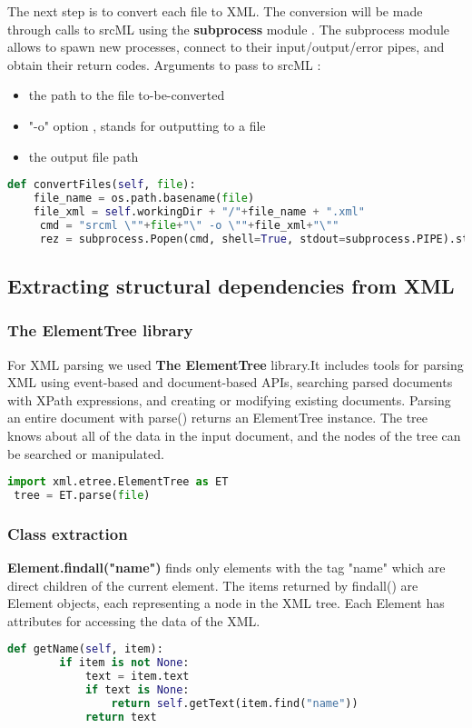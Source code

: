 The next step is to convert each file to XML. The conversion will be made through calls to srcML using the \textbf{subprocess} module . The subprocess module allows to spawn new processes, connect to their input/output/error pipes, and obtain their return codes. 
Arguments to pass to srcML :
\begin{itemize}
  \item the path to the file to-be-converted
  \item "-o" option , stands for outputting to a file 
  \item the output file path
\end{itemize}

\begin{lstlisting}[language=python, caption={Convert source code to XML using subprocess module.}]
def convertFiles(self, file):
    file_name = os.path.basename(file)
    file_xml = self.workingDir + "/"+file_name + ".xml"
     cmd = "srcml \""+file+"\" -o \""+file_xml+"\""
     rez = subprocess.Popen(cmd, shell=True, stdout=subprocess.PIPE).stdout.read()
\end{lstlisting}

\subsection{Extracting structural dependencies from XML}
\subsubsection{The ElementTree library}
For XML parsing we used \textbf{The ElementTree} library.It includes tools for parsing XML using event-based and document-based APIs, searching parsed documents with XPath expressions, and creating or modifying existing documents.
Parsing an entire document with parse() returns an ElementTree instance. The tree knows about all of the data in the input document, and the nodes of the tree can be searched or manipulated.

\begin{lstlisting}[language=python, caption={Import and create ElementTree instance}]
 import xml.etree.ElementTree as ET
 tree = ET.parse(file)
\end{lstlisting}

\subsubsection{Class extraction}
\textbf{Element.findall("name")} finds only elements with the tag "name" which are direct children of the current element. The items returned by findall() are Element objects, each representing a node in the XML tree. Each Element has attributes for accessing the data of the XML.
\begin{lstlisting}[language=python, caption={Get name of  Element item. }]
 def getName(self, item):
        if item is not None:
            text = item.text
            if text is None:
                return self.getText(item.find("name"))
            return text
\end{lstlisting}

